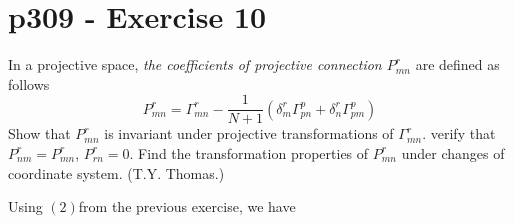 


\section{p309 - Exercise 10}
\begin{tcolorbox}
In a projective space, \textit{the coefficients of projective connection $P^{r}_{mn}$ }are defined as follows
$$P^{r}_{mn} = \Gamma ^{r}_{mn}-\frac{1}{N+1}\left(\delta^r_m \Gamma^p_{pn}+  \delta^r_n \Gamma^p_{pm} \right)$$
Show that $P^{r}_{mn} $ is invariant under projective transformations of $\Gamma^{r}_{mn}$. verify that $P^{r}_{nm}=P^{r}_{mn}$, $P^{r}_{rn}=0$. Find the transformation properties of $P^{r}_{mn}$ under changes of coordinate system. (T.Y. Thomas.)
\end{tcolorbox}
Using $(2)$from the previous exercise, we have

